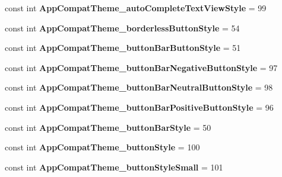 \begin{DoxyCompactItemize}
const int {\bfseries App\+Compat\+Theme\+\_\+auto\+Complete\+Text\+View\+Style} = 99
\item 
\mbox{\label{classXaria_1_1Resource_1_1Styleable_a004329aaf771a5889334da57f7e594a7}} 
const int {\bfseries App\+Compat\+Theme\+\_\+borderless\+Button\+Style} = 54
\item 
\mbox{\label{classXaria_1_1Resource_1_1Styleable_a419a9849d1fa5d1bb4aa114fac9677b2}} 
const int {\bfseries App\+Compat\+Theme\+\_\+button\+Bar\+Button\+Style} = 51
\item 
\mbox{\label{classXaria_1_1Resource_1_1Styleable_a5f9e9391929edde7ca40a9695c61c0be}} 
const int {\bfseries App\+Compat\+Theme\+\_\+button\+Bar\+Negative\+Button\+Style} = 97
\item 
\mbox{\label{classXaria_1_1Resource_1_1Styleable_a4ad528bf59e916295372adb0e6f7e13c}} 
const int {\bfseries App\+Compat\+Theme\+\_\+button\+Bar\+Neutral\+Button\+Style} = 98
\item 
\mbox{\label{classXaria_1_1Resource_1_1Styleable_ab36b880d20e6e9b1d8922eaa0a3b92fd}} 
const int {\bfseries App\+Compat\+Theme\+\_\+button\+Bar\+Positive\+Button\+Style} = 96
\item 
\mbox{\label{classXaria_1_1Resource_1_1Styleable_a7748e682d0095f4324b6b1776a341c36}} 
const int {\bfseries App\+Compat\+Theme\+\_\+button\+Bar\+Style} = 50
\item 
\mbox{\label{classXaria_1_1Resource_1_1Styleable_ad02da1c0f145ba2ca8d80e9e50c67e7e}} 
const int {\bfseries App\+Compat\+Theme\+\_\+button\+Style} = 100
\item 
\mbox{\label{classXaria_1_1Resource_1_1Styleable_a3e09028395ba38972b572dc78b41c4ef}} 
const int {\bfseries App\+Compat\+Theme\+\_\+button\+Style\+Small} = 101
\item 
\mbox{\label{classXaria_1_1Resource_1_1Styleable_af430286ad2a6133968dbcc190e08d4ec}} 

\end{DoxyCompactItemize}
